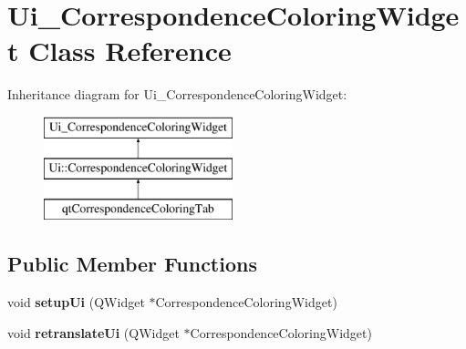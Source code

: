 \hypertarget{class_ui___correspondence_coloring_widget}{}\section{Ui\+\_\+\+Correspondence\+Coloring\+Widget Class Reference}
\label{class_ui___correspondence_coloring_widget}
Inheritance diagram for Ui\+\_\+\+Correspondence\+Coloring\+Widget\+:\begin{figure}[H]
\begin{center}
\leavevmode
\includegraphics[height=3.000000cm]{class_ui___correspondence_coloring_widget}
\end{center}
\end{figure}
\subsection*{Public Member Functions}
\begin{DoxyCompactItemize}
\item 
\hypertarget{class_ui___correspondence_coloring_widget_a604eea657626eb852db231b2eaa9770c}{}void {\bfseries setup\+Ui} (Q\+Widget $\ast$Correspondence\+Coloring\+Widget)\label{class_ui___correspondence_coloring_widget_a604eea657626eb852db231b2eaa9770c}

\item 
\hypertarget{class_ui___correspondence_coloring_widget_ab0069b4a6a474681af5663ea31a0ba42}{}void {\bfseries retranslate\+Ui} (Q\+Widget $\ast$Correspondence\+Coloring\+Widget)\label{class_ui___correspondence_coloring_widget_ab0069b4a6a474681af5663ea31a0ba42}

\end{DoxyCompactItemize}
